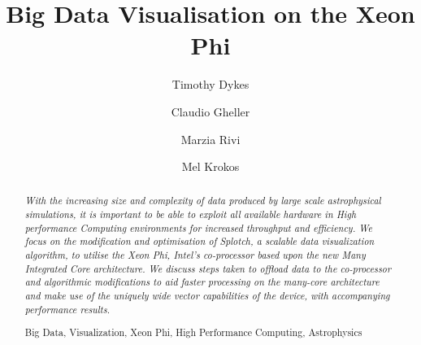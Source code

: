 \documentclass[runningheads,a4paper]{llncs}
\newcommand{\keywords}[1]{\par\addvspace\baselineskip
\noindent\keywordname\enspace\ignorespaces#1}
\begin{document}
\mainmatter  %

\title{Big Data Visualisation on the Xeon Phi}


%
%
\author{Timothy Dykes
\and Claudio Gheller
\and Marzia Rivi
\and Mel Krokos
}
%

\institute{   
   University of Portsmouth,
   Portsmouth, U.K.\\
\mailsa\\
\and
  CSCS-ETHZ,
  Lugano, Switzerland\\
  \email{cgheller@cscs.ch}
\and
   University of Oxford,
   Oxford, U.K.\\
   \email{rivi@physics.ox.ac.uk}\\
}
%
%

\maketitle


\begin{abstract}
\emph{With the increasing size and complexity of data produced by large scale astrophysical simulations, 
it is important to be able to exploit all available hardware in High performance Computing environments 
for increased throughput and efficiency. We focus on the modification and optimisation of Splotch, a 
scalable data visualization algorithm, to utilise the Xeon Phi, Intel's co-processor based upon the new 
Many Integrated Core architecture. We discuss steps taken to offload data to the co-processor and 
algorithmic modifications to aid faster processing on the many-core architecture and make use of the 
uniquely wide vector capabilities of the device, with accompanying performance results.}

\keywords Big Data, Visualization, Xeon Phi, High Performance Computing, Astrophysics
\end{abstract}
\end{document}
